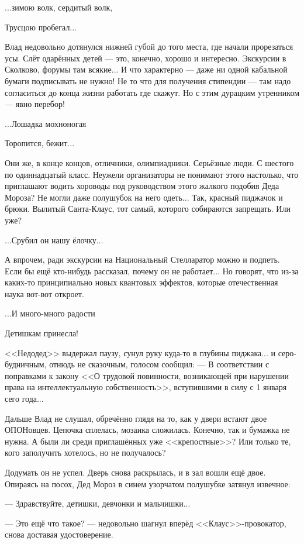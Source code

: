 ...зимою волк, сердитый волк,

Трусцою пробегал... 

Влад недовольно дотянулся нижней губой до того места, где начали прорезаться усы.
Слёт одарённых детей --- это, конечно, хорошо и интересно. Экскурсии в Сколково, форумы там всякие...
И что характерно --- даже ни одной кабальной бумаги подписывать не нужно!
Не то что для получения стипендии --- там надо согласиться до конца жизни работать где скажут.
Но с этим дурацким утренником --- явно перебор!

...Лошадка мохноногая

Торопится, бежит...

Они же, в конце концов, отличники, олимпиадники. Серьёзные люди. С шестого по одиннадцатый класс.
Неужели организаторы не понимают этого настолько,
что приглашают водить хороводы под руководством этого жалкого подобия Деда Мороза?
Не могли даже полушубок на него одеть... Так, красный пиджачок и брюки.
Вылитый Санта-Клаус, тот самый, которого собираются запрещать. Или уже?

...Срубил он нашу ёлочку...

А впрочем, ради экскурсии на Национальный Стелларатор можно и подпеть.
Если бы ещё кто-нибудь рассказал, почему он не работает...
Но говорят, что из-за каких-то принципиально новых квантовых эффектов, которые отечественная наука вот-вот откроет.

...И много-много радости

Детишкам принесла!

<<Недодед>> выдержал паузу, сунул руку куда-то в глубины пиджака... и серо-будничным, отнюдь не сказочным, голосом сообщил:
--- В соответствии с поправками к закону
<<О трудовой повинности, возникающей при нарушении права на интеллектуальную собственность>>,
вступившими в силу с 1 января сего года...

Дальше Влад не слушал, обречённо глядя на то, как у двери встают двое ОПОНовцев.
Цепочка сплелась, мозаика сложилась. Конечно, так и бумажка не нужна. А были ли среди приглашённых уже <<крепостные>>?
Или только те, кого заполучить хотелось, но не получалось?

Додумать он не успел. Дверь снова раскрылась, и в зал вошли ещё двое.
Опираясь на посох, Дед Мороз в синем узорчатом полушубке затянул извечное:

--- Здравствуйте, детишки, девчонки и мальчишки...

--- Это ещё что такое? --- недовольно шагнул вперёд <<Клаус>>-провокатор, снова доставая удостоверение.

